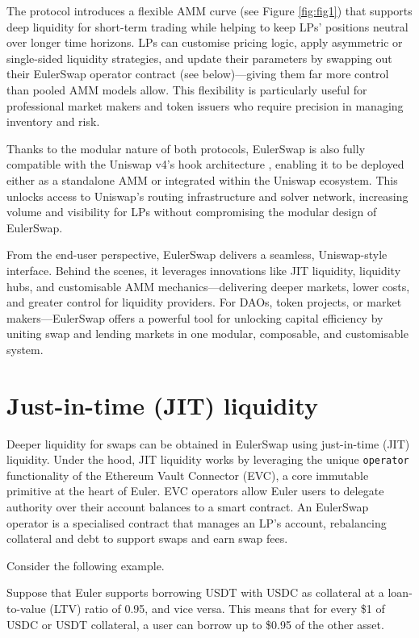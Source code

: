 \documentclass{article}
\begin{document}
The protocol introduces a flexible AMM curve (see Figure \ref{fig:fig1}) that supports deep liquidity for short-term trading while helping to keep LPs' positions neutral over longer time horizons. LPs can customise pricing logic, apply asymmetric or single-sided liquidity strategies, and update their parameters by swapping out their EulerSwap operator contract (see below)—giving them far more control than pooled AMM models allow. This flexibility is particularly useful for professional market makers and token issuers who require precision in managing inventory and risk.

Thanks to the modular nature of both protocols, EulerSwap is also fully compatible with the Uniswap v4's hook architecture \cite{uniswapv4whitepaper}, enabling it to be deployed either as a standalone AMM or integrated within the Uniswap ecosystem. This unlocks access to Uniswap's routing infrastructure and solver network, increasing volume and visibility for LPs without compromising the modular design of EulerSwap.

From the end-user perspective, EulerSwap delivers a seamless, Uniswap-style interface. Behind the scenes, it leverages innovations like JIT liquidity, liquidity hubs, and customisable AMM mechanics—delivering deeper markets, lower costs, and greater control for liquidity providers. For DAOs, token projects, or market makers—EulerSwap offers a powerful tool for unlocking capital efficiency by uniting swap and lending markets in one modular, composable, and customisable system.

\section{Just-in-time (JIT) liquidity}

Deeper liquidity for swaps can be obtained in EulerSwap using just-in-time (JIT) liquidity. Under the hood, JIT liquidity works by leveraging the unique \texttt{operator} functionality of the Ethereum Vault Connector (EVC), a core immutable primitive at the heart of Euler. EVC operators allow Euler users to delegate authority over their account balances to a smart contract. An EulerSwap operator is a specialised contract that manages an LP's account, rebalancing collateral and debt to support swaps and earn swap fees.

Consider the following example.

Suppose that Euler supports borrowing USDT with USDC as collateral at a loan-to-value (LTV) ratio of 0.95, and vice versa. This means that for every \$1 of USDC or USDT collateral, a user can borrow up to \$0.95 of the other asset.
\end{document}
